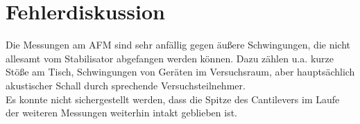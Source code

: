 \section{Fehlerdiskussion}
Die Messungen am AFM sind sehr anfällig gegen äußere Schwingungen, die nicht allesamt vom Stabilisator abgefangen werden können. Dazu zählen u.a. kurze Stöße am Tisch, Schwingungen von Geräten im Versuchsraum, aber hauptsächlich akustischer Schall durch sprechende Versuchsteilnehmer.\\
Es konnte nicht sichergestellt werden, dass die Spitze des Cantilevers im Laufe der weiteren Messungen weiterhin intakt geblieben ist.